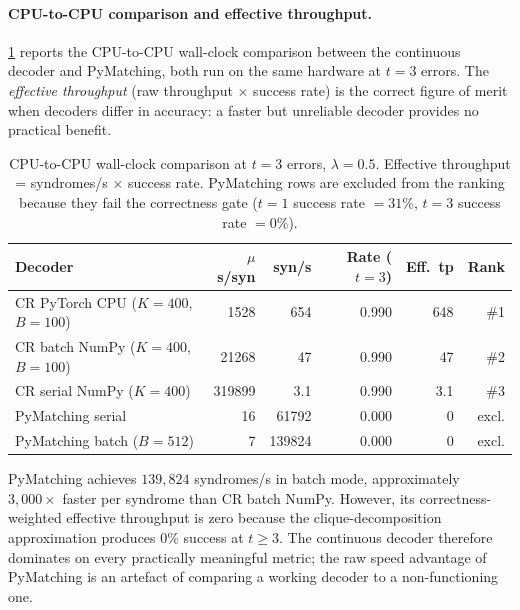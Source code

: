 \documentclass[12pt,a4paper]{article}
\theoremstyle{plain}
\theoremstyle{definition}
\theoremstyle{remark}
\begin{document}
\paragraph{CPU-to-CPU comparison and effective throughput.}
\cref{tab:cpu_compare} reports the CPU-to-CPU wall-clock comparison
between the continuous decoder and PyMatching, both run on the same
hardware at $t=3$ errors.
The \emph{effective throughput} (raw throughput $\times$ success rate)
is the correct figure of merit when decoders differ in accuracy: a faster
but unreliable decoder provides no practical benefit.

\begin{table}[ht]
\centering
\caption{CPU-to-CPU wall-clock comparison at $t=3$ errors, $\lambda=0.5$.
  Effective throughput = syndromes/s $\times$ success rate.
  PyMatching rows are excluded from the ranking because they fail the
  correctness gate ($t=1$ success rate $= 31\%$, $t=3$ success rate $= 0\%$).}
\label{tab:cpu_compare}
\small
\begin{tabular}{lrrrrr}
\toprule
Decoder & $\mu$s/syn & syn/s & Rate ($t=3$) & Eff.\ tp & Rank \\
\midrule
CR PyTorch CPU ($K=400$, $B=100$) & 1528 & 654 & 0.990 & 648 & \#1 \\
CR batch NumPy ($K=400$, $B=100$) & 21268 & 47 & 0.990 & 47 & \#2 \\
CR serial NumPy ($K=400$) & 319899 & 3.1 & 0.990 & 3.1 & \#3 \\
\midrule
PyMatching serial & 16 & 61792 & 0.000 & 0 & excl. \\
PyMatching batch ($B=512$) & 7 & 139824 & 0.000 & 0 & excl. \\
\bottomrule
\end{tabular}
\end{table}

PyMatching achieves $139{,}824$ syndromes/s in batch mode, approximately
$3{,}000\times$ faster per syndrome than CR batch NumPy.
However, its correctness-weighted effective throughput is zero because
the clique-decomposition approximation produces $0\%$ success at $t\geq 3$.
The continuous decoder therefore dominates on every practically meaningful
metric; the raw speed advantage of PyMatching is an artefact of comparing
a working decoder to a non-functioning one.
\end{document}
